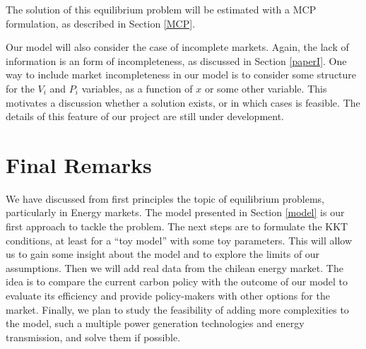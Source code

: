 \documentclass[11pt, letterpaper]{article}
\begin{document}
The solution of this equilibrium problem will be estimated with a MCP formulation, as described in Section \ref{MCP}. 
\smallskip

Our model will also consider the case of incomplete markets. Again, the lack of information is an form of incompleteness, as discussed in Section \ref{paperI}. One way to include market incompleteness in our model is to consider some structure for the $V_i$ and $P_i$ variables, as a function of $x$ or some other variable. This motivates a discussion whether a solution exists, or in which cases is feasible. The details of this feature of our project are still under development. 

\section{Final Remarks}
We have discussed from first principles the topic of equilibrium problems, particularly in Energy markets. The model presented in Section \ref{model} is our first approach to tackle the problem. The next steps are to formulate the KKT conditions, at least for a ``toy model'' with some toy parameters. This will allow us to gain some insight about the model and to explore the limits of our assumptions. Then we will add real data from the chilean energy market. The idea is to compare the current carbon policy with the outcome of our model to evaluate its efficiency and provide policy-makers with other options for the market. Finally, we plan to study the feasibility of adding more complexities to the model, such a multiple power generation technologies and energy transmission, and solve them if possible.  
\end{document}
